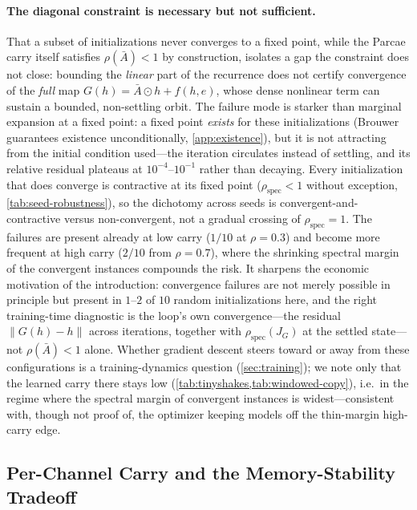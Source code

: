 \documentclass[11pt]{article}
\begin{document}
\paragraph{The diagonal constraint is necessary but not sufficient.} That a subset of initializations never converges to a fixed point, while the Parcae carry itself satisfies $\rho(\bar{A}) < 1$ by construction, isolates a gap the constraint does not close: bounding the \emph{linear} part of the recurrence does not certify convergence of the \emph{full} map $G(h) = \bar{A} \odot h + f(h,e)$, whose dense nonlinear term can sustain a bounded, non-settling orbit. The failure mode is starker than marginal expansion at a fixed point: a fixed point \emph{exists} for these initializations (Brouwer guarantees existence unconditionally, \cref{app:existence}), but it is not attracting from the initial condition used---the iteration circulates instead of settling, and its relative residual plateaus at $10^{-4}$--$10^{-1}$ rather than decaying. Every initialization that does converge is contractive at its fixed point ($\rho_{\text{spec}} < 1$ without exception, \cref{tab:seed-robustness}), so the dichotomy across seeds is convergent-and-contractive versus non-convergent, not a gradual crossing of $\rho_{\text{spec}} = 1$. The failures are present already at low carry ($1/10$ at $\rho = 0.3$) and become more frequent at high carry ($2/10$ from $\rho = 0.7$), where the shrinking spectral margin of the convergent instances compounds the risk. It sharpens the economic motivation of the introduction: convergence failures are not merely possible in principle but present in $1$--$2$ of $10$ random initializations here, and the right training-time diagnostic is the loop's own convergence---the residual $\|G(h)-h\|$ across iterations, together with $\rho_{\text{spec}}(J_G)$ at the settled state---not $\rho(\bar{A}) < 1$ alone. Whether gradient descent steers toward or away from these configurations is a training-dynamics question (\cref{sec:training}); we note only that the learned carry there stays low (\cref{tab:tinyshakes,tab:windowed-copy}), i.e.\ in the regime where the spectral margin of convergent instances is widest---consistent with, though not proof of, the optimizer keeping models off the thin-margin high-carry edge.

\subsection{Per-Channel Carry and the Memory-Stability Tradeoff}
\label{sec:per-channel}
\end{document}
